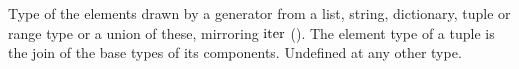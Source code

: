 Type of the elements drawn by a generator from a list, string, dictionary, tuple or range type or a union of these,
mirroring $\mathrm{iter}$ (). The element type of a tuple is the join of the base types of its
components. Undefined at any other type.
